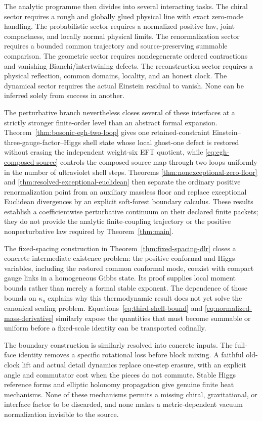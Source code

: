 \documentclass[11pt,a4paper,oneside]{book}
\theoremstyle{plain}
\theoremstyle{definition}
\theoremstyle{remark}
\begin{document}
The analytic programme then divides into several interacting tasks. The chiral sector requires a rough and globally glued physical line with exact zero-mode handling. The probabilistic sector requires a normalized positive law, joint compactness, and locally normal physical limits. The renormalization sector requires a bounded common trajectory and source-preserving summable comparison. The geometric sector requires nondegenerate ordered contractions and vanishing Bianchi/intertwining defects. The reconstruction sector requires a physical reflection, common domains, locality, and an honest clock. The dynamical sector requires the actual Einstein residual to vanish. None can be inferred solely from success in another.

The perturbative branch nevertheless closes several of these interfaces at a
strictly stronger finite-order level than an abstract formal expansion.
Theorem~\ref{thm:bosonic-egh-two-loop} gives one retained-constraint
Einstein--three-gauge-factor--Higgs shell state whose local ghost-one defect is
restored without erasing the independent weight-six EFT quotient, while
\eqref{eq:egh-composed-source} controls the composed source map through two
loops uniformly in the number of ultraviolet shell steps.  Theorems
\ref{thm:nonexceptional-zero-floor} and
\ref{thm:resolved-exceptional-euclidean} then separate the ordinary positive
renormalization point from an auxiliary massless floor and replace exceptional
Euclidean divergences by an explicit soft-forest boundary calculus.  These
results establish a coefficientwise perturbative continuum on their declared
finite packets; they do not provide the analytic finite-coupling trajectory
or the positive nonperturbative law required by Theorem~\ref{thm:main}.

The fixed-spacing construction in
Theorem~\ref{thm:fixed-spacing-dlr} closes a concrete intermediate existence
problem: the positive conformal and Higgs variables, including the restored
common conformal mode, coexist with compact gauge links in a homogeneous
Gibbs state.  Its proof supplies local moment bounds rather than merely a
formal stable exponent.  The dependence of those bounds on $\kappa_g$
explains why this thermodynamic result does not yet solve the canonical
scaling problem.  Equations~\eqref{eq:third-shell-bound} and
\eqref{eq:normalized-mass-derivative} similarly expose the quantities that
must become summable or uniform before a fixed-scale identity can be
transported cofinally.

The boundary construction is similarly resolved into concrete inputs.
The full-face identity removes a specific rotational loss before block
mixing.  A faithful old-clock lift and actual detail dynamics replace
one-step erasure, with an explicit angle and commutator cost when the
pieces do not commute.  Stable Higgs reference forms and elliptic
holonomy propagation give genuine finite heat mechanisms.  None of
these mechanisms permits a missing chiral, gravitational, or interface
factor to be discarded, and none makes a metric-dependent vacuum
normalization invisible to the source.
\end{document}
